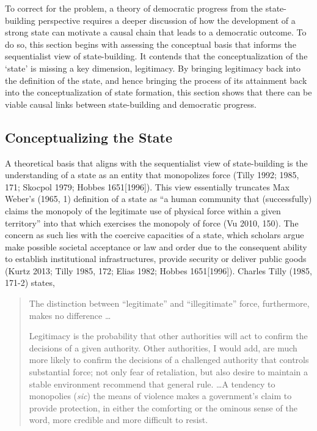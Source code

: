 \documentclass [11pt]{article}
\begin{document}
To correct for the problem, a theory of democratic progress from the state-building perspective requires a deeper discussion of how the development of a strong state can motivate a causal chain that leads to a democratic outcome. To do so, this section begins with assessing the conceptual basis that informs the sequentialist view of state-building. It contends that the conceptualization of the `state' is missing a key dimension, legitimacy. By bringing legitimacy back into the definition of the state, and hence bringing the process of its attainment back into the conceptualization of state formation, this section shows that there can be viable causal links between state-building and democratic progress.

\subsection*{Conceptualizing the State}

A theoretical basis that aligns with the sequentialist view of state-building is the understanding of a state as an entity that monopolizes force (Tilly 1992; 1985, 171; Skocpol 1979; Hobbes 1651[1996]). This view essentially truncates Max Weber's (1965, 1) definition of a state as “a human community that (successfully) claims the monopoly of the legitimate use of physical force within a given territory” into that which exercises the monopoly of force (Vu 2010, 150). The concern as such lies with the coercive capacities of a state, which scholars argue make possible societal acceptance or law and order due to the consequent ability to establish institutional infrastructures, provide security or deliver public goods (Kurtz 2013; Tilly 1985, 172; Elias 1982; Hobbes 1651[1996]). Charles Tilly (1985, 171-2) states,

\begin{quote}
\small
The distinction between ``legitimate'' and ``illegitimate'' force, furthermore, makes no difference \dots

Legitimacy is the probability that other authorities will act to confirm the decisions of a given authority. Other authorities, I would add, are much more likely to confirm the decisions of a challenged authority that controls substantial force; not only fear of retaliation, but also desire to maintain a stable environment recommend that general rule. \dots A tendency to monopolies (\emph{sic}) the means of violence makes a government's claim to provide protection, in either the comforting or the ominous sense of the word, more credible and more difficult to resist.
\end{quote}
\end{document}
